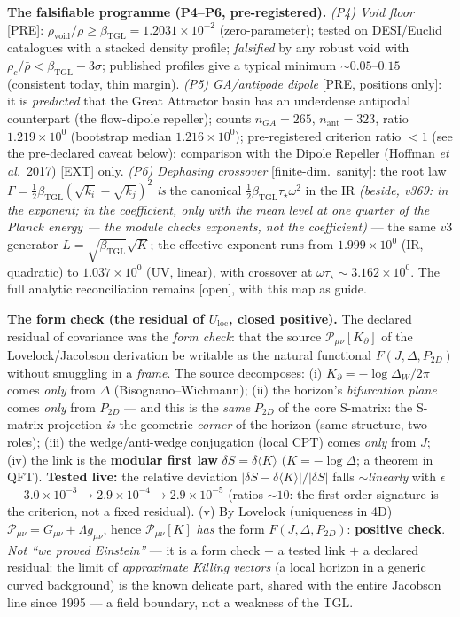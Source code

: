 \documentclass[11pt]{article}
\newcommand{\bTGL}{\beta_{\mathrm{TGL}}}\newcommand{\Msun}{M_{\odot}}\newcommand{\TGL}{\mathrm{TGL}}
\theoremstyle{definition}\newtheorem{deriv}{Derivation}
\begin{document}
\textbf{The falsifiable programme (P4--P6, pre-registered).} \emph{(P4) Void floor} [PRE]: $\rho_{\mathrm{void}}/\bar\rho\ge\bTGL=1.2031\times10^{-2}$ (zero-parameter); tested on DESI/Euclid catalogues with a stacked density profile; \emph{falsified} by any robust void with $\rho_c/\bar\rho<\bTGL-3\sigma$; published profiles give a typical minimum $\sim0.05$--$0.15$ (consistent today, thin margin). \emph{(P5) GA/antipode dipole} [PRE, positions only]: it is \emph{predicted} that the Great Attractor basin has an underdense antipodal counterpart (the flow-dipole repeller); counts $n_{GA}=265$, $n_{\mathrm{ant}}=323$, ratio $1.219\times10^{0}$ (bootstrap median $1.216\times10^{0}$); pre-registered criterion ratio $<1$ (see the pre-declared caveat below); comparison with the Dipole Repeller (Hoffman \emph{et al.}\ 2017) [EXT] only. \emph{(P6) Dephasing crossover} [finite-dim.\ sanity]: the root law $\Gamma=\tfrac12\bTGL(\sqrt{k_i}-\sqrt{k_j})^2$ \emph{is} the canonical $\tfrac12\bTGL\tau_\star\omega^2$ in the IR \emph{(beside, v369: in the exponent; in the coefficient, only with the mean level at one quarter of the Planck energy --- the module checks exponents, not the coefficient)} --- the same $v3$ generator $L=\sqrt{\bTGL}\sqrt{K}$; the effective exponent runs from $1.999\times10^{0}$ (IR, quadratic) to $1.037\times10^{0}$ (UV, linear), with crossover at $\omega\tau_\star\sim3.162\times10^{0}$. The full analytic reconciliation remains [open], with this map as guide.

\textbf{The form check (the residual of $U_{\mathrm{loc}}$, closed positive).} The declared residual of covariance was the \emph{form check}: that the source $\mathcal P_{\mu\nu}[K_\partial]$ of the Lovelock/Jacobson derivation be writable as the natural functional $F(J,\Delta,P_{2D})$ without smuggling in a \emph{frame}. The source decomposes: (i) $K_\partial=-\log\Delta_W/2\pi$ comes \emph{only} from $\Delta$ (Bisognano--Wichmann); (ii) the horizon's \emph{bifurcation plane} comes \emph{only} from $P_{2D}$ --- and this is the \emph{same} $P_{2D}$ of the core S-matrix: the S-matrix projection \emph{is} the geometric \emph{corner} of the horizon (same structure, two roles); (iii) the wedge/anti-wedge conjugation (local CPT) comes \emph{only} from $J$; (iv) the link is the \textbf{modular first law} $\delta S=\delta\langle K\rangle$ ($K=-\log\Delta$; a theorem in QFT). \textbf{Tested live:} the relative deviation $|\delta S-\delta\langle K\rangle|/|\delta S|$ falls $\sim$\emph{linearly} with $\epsilon$ --- $3.0\times10^{-3}\to2.9\times10^{-4}\to2.9\times10^{-5}$ (ratios $\sim10$: the first-order signature is the criterion, not a fixed residual). (v) By Lovelock (uniqueness in 4D) $\mathcal P_{\mu\nu}=G_{\mu\nu}+\Lambda g_{\mu\nu}$, hence $\mathcal P_{\mu\nu}[K]$ \emph{has} the form $F(J,\Delta,P_{2D})$: \textbf{positive check}. \emph{Not ``we proved Einstein''} --- it is a form check $+$ a tested link $+$ a declared residual: the limit of \emph{approximate Killing vectors} (a local horizon in a generic curved background) is the known delicate part, shared with the entire Jacobson line since 1995 --- a field boundary, not a weakness of the $\TGL$.
\end{document}
